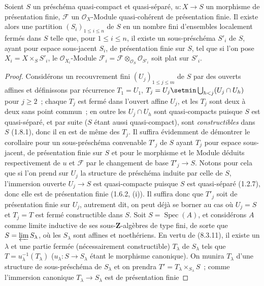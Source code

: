 \begin{corollary}[8.9.5]
\label{IV.8.9.5-fr}
Soient $S$ un préschéma quasi-compact et quasi-séparé, $u:X\to S$ un
morphisme de présentation finie, $\mathcal F$ un $\mathcal O_X$-Module
quasi-cohérent de présentation finie. Il existe alors une partition
$(S_i)_{1\leq i\leq n}$ de $S$ en un nombre fini d'ensembles localement fermés
dans $S$ telle que, pour $1\leq i\leq n$, il existe un sous-préschéma $S'_i$
de $S$, ayant pour espace sous-jacent $S_i$, de présentation finie sur $S$,
tel que si l'on pose $X_i=X\times_SS'_i$, le $\mathcal O_{X_i}$-Module
$\mathcal F_i=\mathcal F\otimes_{\mathcal O_S}\mathcal O_{S'_i}$ soit plat
sur $S'_i$.
\end{corollary}

\begin{proof}
Considérons un recouvrement fini $(U_j)_{1\leq j\leq m}$ de $S$ par des
ouverts affines et définissons par récurrence $T_1=U_1$,
$T_j=U_j\setmin\bigcup_{h<j}(U_j\cap U_h)$ pour $j\geq2$~; chaque $T_j$ est fermé
dans l'ouvert affine $U_j$, et les $T_j$ sont deux à deux sans point commun~;
en outre les $U_j\cap U_h$ sont quasi-compacts puisque $S$ est quasi-séparé,
et par suite ($S$ étant aussi quasi-compact), sont \emph{constructibles} dans $S$
(1.8.1), donc il en est de même des $T_j$. Il suffira évidemment de
démontrer le corollaire pour un sous-préschéma convenable $T'_j$ de $S$ ayant
$T_j$ pour espace sous-jacent, de présentation finie sur $S$ et pour le
morphisme et le Module déduits respectivement de $u$ et $\mathcal F$ par le
changement de base $T'_j\to S$. Notons pour cela que si l'on prend sur $U_j$
la structure de préschéma induite par celle de $S$, l'immersion ouverte
$U_j\to S$ est quasi-compacte puisque $S$ est quasi-séparé (1.2.7), donc
elle est de
présentation finie (1.6.2, (i)). Il suffira donc que $T'_j$ soit de
présentation finie sur $U_j$, autrement dit, on peut déjà se borner au cas où
$U_j=S$ et $T_j=T$ est fermé constructible dans $S$.
Soit $S=\operatorname{Spec}(A)$, et considérons $A$ comme limite inductive de
ses sous-$\mathbf Z$-algèbres de type fini, de sorte que
$S=\varprojlim S_\lambda$, où les $S_\lambda$ sont affines et noethériens. En
vertu de (8.3.11), il existe un $\lambda$ et une partie fermée (nécessairement
constructible) $T_\lambda$ de $S_\lambda$ tels que
$T=u_\lambda^{-1}(T_\lambda)$ ($u_\lambda:S\to S_\lambda$ étant le morphisme
canonique). On munira $T_\lambda$ d'une structure de sous-préschéma de
$S_\lambda$ et on prendra $T'=T_\lambda\times_{S_\lambda}S$~; comme
l'immersion canonique $T_\lambda\to S_\lambda$ est de présentation finie

\end{proof}

